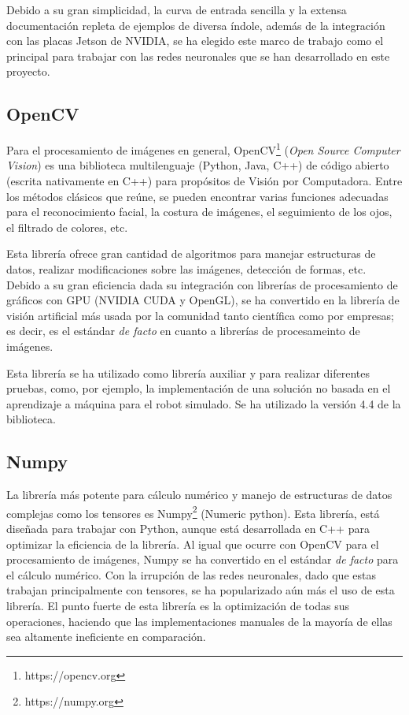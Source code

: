 Debido a su gran simplicidad, la curva de entrada sencilla y la extensa documentación repleta de ejemplos de diversa índole, además de la integración con las placas Jetson de NVIDIA, se ha elegido este marco de trabajo como el principal para trabajar con las redes neuronales que se han desarrollado en este proyecto.

\subsection{OpenCV}

Para el procesamiento de imágenes en general, OpenCV\footnote{https://opencv.org} (\textit{Open Source Computer Vision}) es una biblioteca multilenguaje (Python, Java, C++) de código abierto (escrita nativamente en C++) para propósitos de Visión por Computadora. Entre los métodos clásicos que reúne, se pueden encontrar varias funciones adecuadas para el reconocimiento facial, la costura de imágenes, el seguimiento de los ojos, el filtrado de colores, etc.

Esta librería ofrece gran cantidad de algoritmos para manejar estructuras de datos, realizar modificaciones sobre las imágenes, detección de formas, etc. Debido a su gran eficiencia dada su integración con librerías de procesamiento de gráficos con GPU (NVIDIA CUDA y OpenGL), se ha convertido en la librería de visión artificial más usada por la comunidad tanto científica como por empresas; es decir, es el estándar \textit{de facto} en cuanto a librerías de procesameinto de imágenes.

Esta librería se ha utilizado como librería auxiliar y para realizar diferentes pruebas, como, por ejemplo, la implementación de una solución no basada en el aprendizaje a máquina para el robot simulado. Se ha utilizado la versión 4.4 de la biblioteca.

\subsection{Numpy}

La librería más potente para cálculo numérico y manejo de estructuras de datos complejas como los tensores es Numpy\footnote{https://numpy.org} (Numeric python). Esta librería, está diseñada para trabajar con Python, aunque está desarrollada en C++ para optimizar la eficiencia de la librería. Al igual que ocurre con OpenCV para el procesamiento de imágenes, Numpy se ha convertido en el estándar \textit{de facto} para el cálculo numérico. Con la irrupción de las redes neuronales, dado que estas trabajan principalmente con tensores, se ha popularizado aún más el uso de esta librería. El punto fuerte de esta librería es la optimización de todas sus operaciones, haciendo que las implementaciones manuales de la mayoría de ellas sea altamente ineficiente en comparación.

